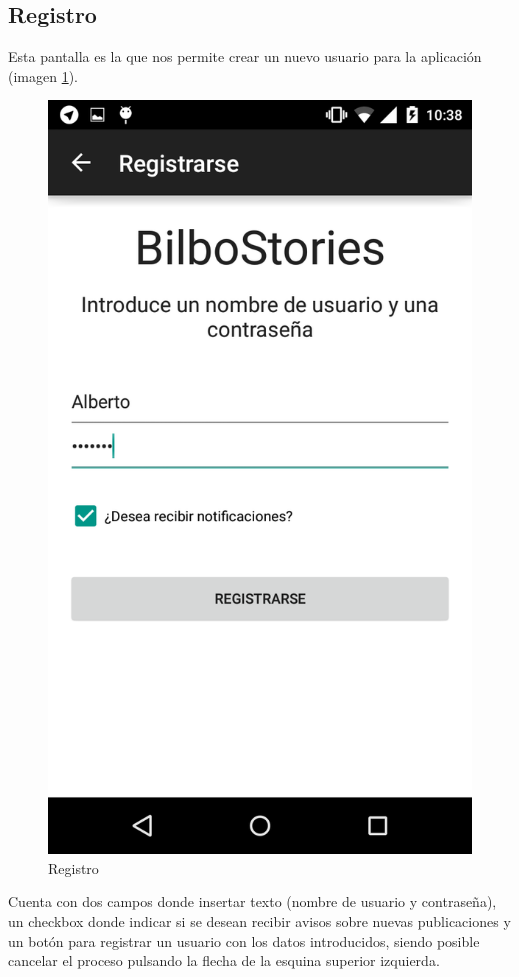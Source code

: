 \documentclass[11pt,a4paper, titlepage]{article}
\begin{document}
	\FloatBarrier
	\subsection[Registro]{Registro}
	\label{regis}
	
	Esta pantalla es la que nos permite crear un nuevo usuario para la aplicación (imagen \ref{p14}). 
	
	\begin{figure}[hbtp]
		\centering
		\includegraphics[scale = 0.25 ]{img/2}
		\caption{Registro}
		\label{p14}
	\end{figure}
Cuenta con dos campos donde insertar texto (nombre de usuario y contraseña), un checkbox donde indicar si se desean recibir avisos sobre nuevas publicaciones y un botón para registrar un usuario con los datos introducidos, siendo posible cancelar el proceso pulsando la flecha de la esquina superior izquierda.
\end{document}
